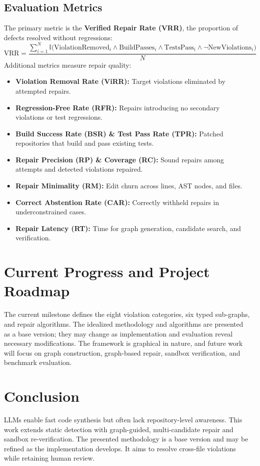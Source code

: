 \documentclass[10pt,a4paper]{article}
\begin{document}
\subsection{Evaluation Metrics}
The primary metric is the \textbf{Verified Repair Rate (VRR)}, the proportion of defects resolved without regressions:
\begin{equation}
\text{VRR} = \frac{\sum_{i=1}^{N} \mathbb{I}\Big(\text{ViolationRemoved}_i \wedge \text{BuildPasses}_i \wedge \text{TestsPass}_i \wedge \neg\text{NewViolations}_i\Big)}{N}
\end{equation}
Additional metrics measure repair quality:
\begin{itemize}
  \item \textbf{Violation Removal Rate (ViRR):} Target violations eliminated by attempted repairs.
  \item \textbf{Regression-Free Rate (RFR):} Repairs introducing no secondary violations or test regressions.
  \item \textbf{Build Success Rate (BSR) \& Test Pass Rate (TPR):} Patched repositories that build and pass existing tests.
  \item \textbf{Repair Precision (RP) \& Coverage (RC):} Sound repairs among attempts and detected violations repaired.
  \item \textbf{Repair Minimality (RM):} Edit churn across lines, AST nodes, and files.
  \item \textbf{Correct Abstention Rate (CAR):} Correctly withheld repairs in underconstrained cases.
  \item \textbf{Repair Latency (RT):} Time for graph generation, candidate search, and verification.
\end{itemize}

\section{Current Progress and Project Roadmap}
The current milestone defines the eight violation categories, six typed sub-graphs, and repair algorithms. The idealized methodology and algorithms are presented as a base version; they may change as implementation and evaluation reveal necessary modifications. The framework is graphical in nature, and future work will focus on graph construction, graph-based repair, sandbox verification, and benchmark evaluation.

\section{Conclusion}
LLMs enable fast code synthesis but often lack repository-level awareness. This work extends static detection with graph-guided, multi-candidate repair and sandbox re-verification. The presented methodology is a base version and may be refined as the implementation develops. It aims to resolve cross-file violations while retaining human review.
\end{document}
